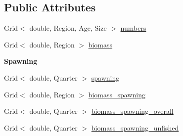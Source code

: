 \subsection*{Public Attributes}
\begin{DoxyCompactItemize}
\item 
Grid$<$ double, Region, Age, Size $>$ \hyperlink{classIOSKJ_1_1Model_a6dd60d98959cc31142f0b4118d52d8b3}{numbers}
\item 
Grid$<$ double, Region $>$ \hyperlink{classIOSKJ_1_1Model_a8fe11b46a1391ffab784a7e48b6dff3d}{biomass}
\end{DoxyCompactItemize}
\begin{Indent}{\bf Spawning}\par
\begin{DoxyCompactItemize}
\item 
Grid$<$ double, Quarter $>$ \hyperlink{classIOSKJ_1_1Model_a2d388216b15e6f23df852c16c82b9fe1}{spawning}
\item 
Grid$<$ double, Region $>$ \hyperlink{classIOSKJ_1_1Model_aa39c5fd0a4bdfed3c382ebefe64afafd}{biomass\-\_\-spawning}
\item 
Grid$<$ double, Quarter $>$ \hyperlink{classIOSKJ_1_1Model_a8b9aed5a27c23dbe163daac575375560}{biomass\-\_\-spawning\-\_\-overall}
\item 
Grid$<$ double, Quarter $>$ \hyperlink{classIOSKJ_1_1Model_accfa0dcd961f4e5d3a02d390333e4097}{biomass\-\_\-spawning\-\_\-unfished}
\end{DoxyCompactItemize}
\end{Indent}
